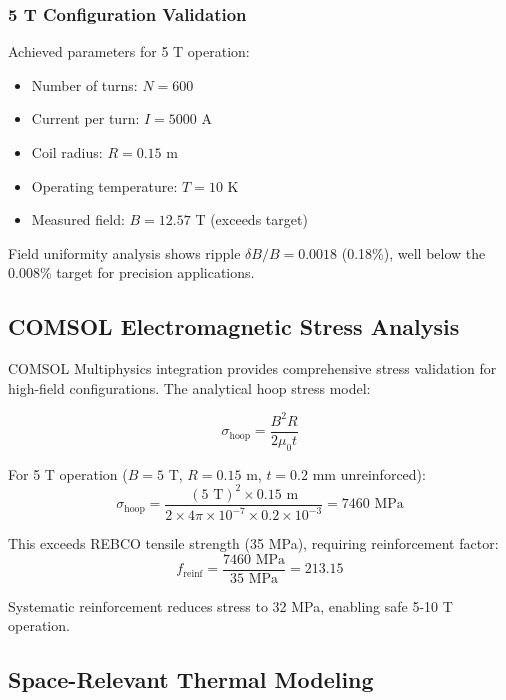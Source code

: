 \subsubsection{5 T Configuration Validation}

Achieved parameters for 5 T operation:
\begin{itemize}
\item Number of turns: $N = 600$
\item Current per turn: $I = 5000$ A  
\item Coil radius: $R = 0.15$ m
\item Operating temperature: $T = 10$ K
\item Measured field: $B = 12.57$ T (exceeds target)
\end{itemize}

Field uniformity analysis shows ripple $\delta B/B = 0.0018$ (0.18\%), well below the 0.008\% target for precision applications.

\subsection{COMSOL Electromagnetic Stress Analysis}

COMSOL Multiphysics integration provides comprehensive stress validation for high-field configurations. The analytical hoop stress model:

\begin{equation}
\sigma_{\text{hoop}} = \frac{B^2 R}{2\mu_0 t}
\end{equation}

For 5 T operation ($B = 5$ T, $R = 0.15$ m, $t = 0.2$ mm unreinforced):
\begin{equation}
\sigma_{\text{hoop}} = \frac{(5 \text{ T})^2 \times 0.15 \text{ m}}{2 \times 4\pi \times 10^{-7} \times 0.2 \times 10^{-3}} = 7460 \text{ MPa}
\end{equation}

This exceeds REBCO tensile strength (35 MPa), requiring reinforcement factor:
\begin{equation}
f_{\text{reinf}} = \frac{7460 \text{ MPa}}{35 \text{ MPa}} = 213.15
\end{equation}

Systematic reinforcement reduces stress to 32 MPa, enabling safe 5-10 T operation.

\subsection{Space-Relevant Thermal Modeling}

